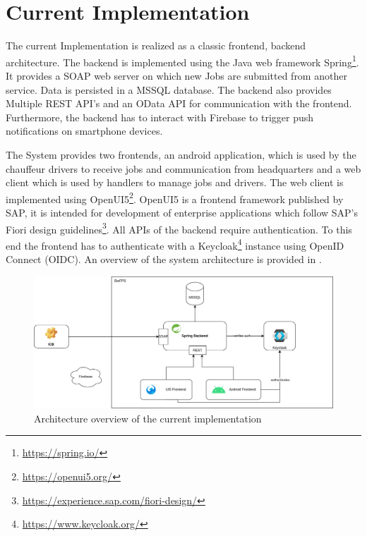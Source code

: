 \section{Current Implementation}

The current Implementation is realized as a classic frontend, backend architecture. The backend is implemented using the Java web framework Spring\footnote{\url{https://spring.io/}}. It provides a SOAP web server on which new Jobs are submitted from another service. Data is persisted in a MSSQL database. The backend also provides Multiple REST API's and an OData API for communication with the frontend. Furthermore, the backend has to interact with Firebase to trigger push notifications on smartphone devices.

The System provides two frontends, an android application, which is used by the chauffeur drivers to receive jobs and communication from headquarters and a web client which is used by handlers to manage jobs and drivers. The web client is implemented using OpenUI5\footnote{\url{https://openui5.org/}}. OpenUI5 is a frontend framework published by SAP, it is intended for development of enterprise applications which follow SAP's Fiori design guidelines\footnote{\url{https://experience.sap.com/fiori-design/}}. All APIs of the backend require authentication. To this end the frontend has to authenticate with a Keycloak\footnote{\url{https://www.keycloak.org/}} instance using OpenID Connect (OIDC). An overview of the system architecture is provided in .

\begin{figure}[ht]
    \centering
    \includegraphics[width=.8\linewidth]{assets/dswfd-architecture}
    \caption{Architecture overview of the current implementation}
    \label{fig:dswfd-architecture}
\end{figure}

